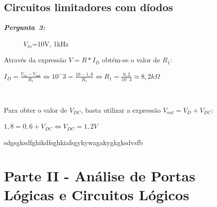 \documentclass[pdftex,12pt,a4paper]{report}
\begin{document}
\subsection{Circuitos limitadores com díodos}
\hbox{\emph{\textbf{Pergunta 3:}\newline}}

\begin{figure}[h]
\centerline{}
\caption{$V_{in}$=10V, 1kHz}\label{circuito13}
\end{figure}
Através da expressão $V = R*I_D$ obtém-se o valor de $R_1$:\newline
\centerline{$I_D = \frac{V_{in} - V_{out}}{R_1} \Leftrightarrow 10^-3 = \frac{10-1,8}{R_1} \Leftrightarrow R_1 = \frac{8,2}{10^-3} \simeq 8,2k\Omega$}\\
\vspace{0.1cm}

Para obter o valor de $V_{DC}$, basta utilizar a expressão $V_{out} = V_D + V_{DC}$:
\centerline{$ 1,8 = 0,6 + V_{DC} \Leftrightarrow V_{DC} = 1,2V$}

sdgsgksdfghikdfsghkiafsgykywagakygkgksdvsfb

\begin{figure}[h]
\centerline{}
\caption{ }\label{grafico_1c_osciloscopio}
\end{figure}

\newpage

\section{Parte II - Análise	de	Portas	Lógicas	e	Circuitos	Lógicos}
\end{document}
